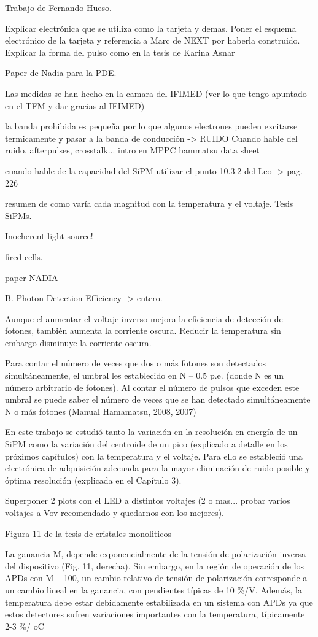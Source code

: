 Trabajo de Fernando Hueso.

Explicar electrónica que se utiliza como la tarjeta y demas. Poner el esquema electrónico de la tarjeta y referencia a Marc de NEXT por haberla construido. Explicar la forma del pulso como en la tesis de Karina Asnar

Paper de Nadia para la PDE.

Las medidas se han hecho en la camara del IFIMED (ver lo que tengo apuntado en el TFM y dar gracias al IFIMED)

la banda prohibida es pequeña por lo que algunos electrones pueden excitarse termicamente y pasar a la banda de conducción -> RUIDO
Cuando hable del ruido, afterpulses, crosstalk... intro en MPPC hammatsu data sheet

cuando hable de la capacidad del SiPM utilizar el punto 10.3.2 del Leo -> pag. 226

resumen de como varía cada magnitud con la temperatura y el voltaje. Tesis SiPMs.

Inocherent light source!

fired cells.


paper NADIA

B. Photon Detection Efficiency -> entero.

Aunque el aumentar el voltaje inverso mejora la eficiencia de detección de fotones, también aumenta la corriente oscura. Reducir la temperatura sin embargo disminuye la corriente oscura.

Para contar el número de veces que dos o más fotones son detectados simultáneamente, el umbral les establecido en N – 0.5 p.e. (donde N es un número arbitrario de fotones). Al contar el número de pulsos que exceden este umbral se puede saber el número de veces que se han detectado simultáneamente N o más fotones (Manual Hamamatsu, 2008, 2007)

En este trabajo se estudió tanto la variación en la resolución en energía de un SiPM como la variación del centroide de un pico (explicado a detalle en los próximos capítulos) con la temperatura y el voltaje. Para ello se estableció una electrónica de adquisición adecuada para la mayor eliminación de ruido posible y óptima resolución (explicada en el Capítulo 3).


Superponer 2 plots con el LED a distintos voltajes (2 o mas... probar varios voltajes a Vov recomendado y quedarnos con los mejores).

Figura 11 de la tesis de cristales monoliticos

La ganancia M, depende exponencialmente de la tensión de polarización inversa del dispositivo (Fig. 11, derecha). Sin embargo, en la región de operación de los APDs con M ~ 100, un cambio relativo de tensión de polarización corresponde a un cambio lineal en la ganancia, con pendientes típicas de 10 \%/V. Además, la temperatura debe estar debidamente estabilizada en un sistema con APDs ya que estos detectores sufren variaciones importantes con la temperatura, típicamente ~ 2-3 \%/ oC

